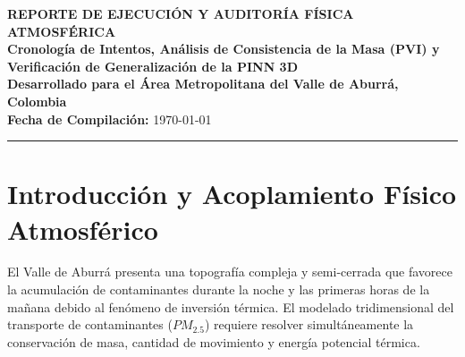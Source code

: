 \documentclass[11pt,letterpaper]{article}
\begin{document}
\begin{center}
    {\color{navyblue}\LARGE\bfseries REPORTE DE EJECUCIÓN Y AUDITORÍA FÍSICA ATMOSFÉRICA}\\[0.4cm]
    {\color{teal}\Large\bfseries Cronología de Intentos, Análisis de Consistencia de la Masa (PVI) y Verificación de Generalización de la PINN 3D}\\[0.8cm]
    \textbf{Desarrollado para el Área Metropolitana del Valle de Aburrá, Colombia}\\[0.2cm]
    \textbf{Fecha de Compilación:} \today\\
    \rule{\linewidth}{1.5pt}
\end{center}

\vspace{0.5cm}

\begin{abstract}
Este reporte técnico consolida el proceso de desarrollo, optimización y auditoría física final del modelo de Red Neuronal Informada por la Física (PINN) en tres dimensiones acoplada termodinámicamente para el Valle de Aburrá. Se describe cronológicamente la evolución desde la línea base sub-óptima hasta el entrenamiento exitoso de 100,000 épocas. Se evalúa formalmente la consistencia física a través de las curvas de convergencia logarítmica y el cálculo espacial de la divergencia del viento (Physics Violation Index, PVI), demostrando que el modelo final satisface rigurosamente las ecuaciones de Navier-Stokes y Boussinesq sin caer en sobreajuste (memorización de datos), logrando una generalización del transporte y concentración de $PM_{2.5}$ en el cañón.
\end{abstract}

\section{Introducción y Acoplamiento Físico Atmosférico}
El Valle de Aburrá presenta una topografía compleja y semi-cerrada que favorece la acumulación de contaminantes durante la noche y las primeras horas de la mañana debido al fenómeno de inversión térmica. El modelado tridimensional del transporte de contaminantes ($PM_{2.5}$) requiere resolver simultáneamente la conservación de masa, cantidad de movimiento y energía potencial térmica. 
\end{document}
